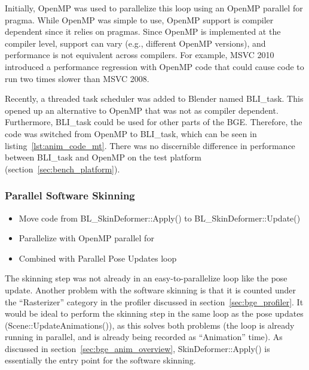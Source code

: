Initially, OpenMP\cite{openmp} was used to parallelize this loop using an OpenMP parallel for pragma.
While OpenMP was simple to use, OpenMP support is compiler dependent since it relies on pragmas.
Since OpenMP is implemented at the compiler level, support can vary (e.g., different OpenMP versions), and performance is not equivalent across compilers.
For example,  MSVC 2010 introduced a performance regression with OpenMP code that could cause code to run two times slower than MSVC 2008.

Recently, a threaded task scheduler was added to Blender named BLI\_task. 
This opened up an alternative to OpenMP that was not as compiler dependent.
Furthermore, BLI\_task could be used for other parts of the BGE.
Therefore, the code was switched from OpenMP to BLI\_task, which can be seen in listing~\ref{lst:anim_code_mt}.
There was no discernible difference in performance between BLI\_task and OpenMP on the test platform (section~\ref{sec:bench_platform}).



\subsubsection{Parallel Software Skinning}
\label{sec:parallel_software_skinning}
\ifsummaries
\begin{itemize}
 \item Move code from BL\_SkinDeformer::Apply() to BL\_SkinDeformer::Update()
 \item Parallelize with OpenMP parallel for
 \item Combined with Parallel Pose Updates loop
\end{itemize}
\fi

The skinning step was not already in an easy-to-parallelize loop like the pose update.
Another problem with the software skinning is that it is counted under the ``Rasterizer'' category in the profiler discussed in section~\ref{sec:bge_profiler}.
It would be ideal to perform the skinning step in the same loop as the pose updates (Scene::UpdateAnimations()), as this solves both problems (the loop is already running in parallel, and is already being recorded as ``Animation'' time).
As discussed in section~\ref{sec:bge_anim_overview}, SkinDeformer::Apply() is essentially the entry point for the software skinning.


